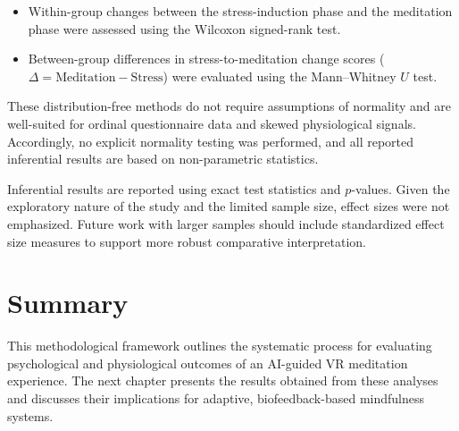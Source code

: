 \begin{itemize}
    \item Within-group changes between the stress-induction phase and the meditation phase were assessed using the Wilcoxon signed-rank test. 
    \item Between-group differences in stress-to-meditation change scores ($\Delta = \text{Meditation} - \text{Stress}$) were evaluated using the Mann--Whitney $U$ test\cite{mann1947}.
\end{itemize}


These distribution-free methods do not require assumptions of normality and are well-suited for ordinal questionnaire data and skewed physiological signals. Accordingly, no explicit normality testing was performed, and all reported inferential results are based on non-parametric statistics.

Inferential results are reported using exact test statistics and $p$-values.
Given the exploratory nature of the study and the limited sample size,
effect sizes were not emphasized. Future work with larger samples should
include standardized effect size measures to support more robust
comparative interpretation.


\section{Summary}
This methodological framework outlines the systematic process for evaluating psychological and physiological outcomes of an AI-guided VR meditation experience. The next chapter presents the results obtained from these analyses and discusses their implications for adaptive, biofeedback-based mindfulness systems.